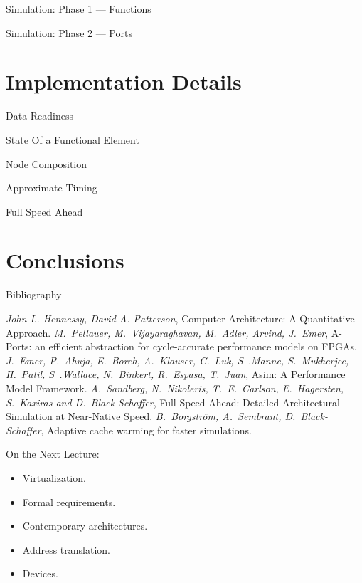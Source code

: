 \begin{frame}{Simulation: Phase 1 --- Functions}
\centering
{}
\end{frame}

\begin{frame}{Simulation: Phase 2 --- Ports}
\centering
{}
\end{frame}

\section{Implementation Details}

\begin{frame}{Data Readiness}
\centering
{}
\end{frame}

\begin{frame}{State Of a Functional Element}
\centering
{}
\end{frame}

\begin{frame}{Node Composition}
\centering
{}
\end{frame}

\begin{frame}{Approximate Timing}
\centering
{}
\end{frame}

\begin{frame}{Full Speed Ahead}
\centering
{}
\end{frame}

\section*{Conclusions}

\begin{frame}[allowframebreaks]{Bibliography}
\begin{thebibliography}{99}
\bibitem{} \textit{John L. Hennessy, David A. Patterson},
  Computer Architecture: A Quantitative Approach.
\bibitem{} \textit{M.~Pellauer, M.~Vijayaraghavan, M.~Adler, Arvind, J.~Emer},
  A-Ports: an efficient abstraction for cycle-accurate performance models on
  FPGAs.
\bibitem{} \textit{J.~Emer, P.~Ahuja, E.~Borch, A.~Klauser, C.~Luk,
  S~.Manne, S.~Mukherjee, H.~Patil, S~.Wallace, N.~Binkert, R.~Espasa, T.~Juan},
  Asim: A Performance Model Framework.
\bibitem{} \textit{A.~Sandberg, N.~Nikoleris, T.~E.~Carlson, E.~Hagersten,
  S.~Kaxiras and D.~Black-Schaffer}, Full Speed Ahead: Detailed Architectural
  Simulation at Near-Native Speed.
\bibitem{} \textit{B.~Borgstr\"{o}m, A.~Sembrant, D.~Black-Schaffer}, Adaptive
  cache warming for faster simulations.
\end{thebibliography}
\end{frame}

\begin{frame}{On the Next Lecture:}
\begin{itemize}
\item Virtualization.
\item Formal requirements.
\item Contemporary architectures.
\item Address translation.
\item Devices.
\end{itemize}
\end{frame}

\finalslide


